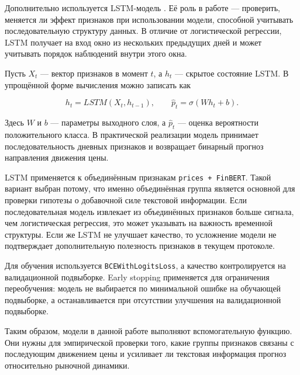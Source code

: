 Дополнительно используется LSTM-модель \cite{hochreiter1997lstm}. Её роль в работе --- проверить, меняется ли эффект признаков при использовании модели, способной учитывать последовательную структуру данных. В отличие от логистической регрессии, LSTM получает на вход окно из нескольких предыдущих дней и может учитывать порядок наблюдений внутри этого окна.

Пусть $X_t$ --- вектор признаков в момент $t$, а $h_t$ --- скрытое состояние LSTM. В упрощённой форме вычисления можно записать как

\[
h_t = LSTM(X_t, h_{t-1}),
\qquad
\widehat{p}_t = \sigma(W h_t + b).
\]

Здесь $W$ и $b$ --- параметры выходного слоя, а $\widehat{p}_t$ --- оценка вероятности положительного класса. В практической реализации модель принимает последовательность дневных признаков и возвращает бинарный прогноз направления движения цены.

LSTM применяется к объединённым признакам \texttt{prices + FinBERT}. Такой вариант выбран потому, что именно объединённая группа является основной для проверки гипотезы о добавочной силе текстовой информации. Если последовательная модель извлекает из объединённых признаков больше сигнала, чем логистическая регрессия, это может указывать на важность временной структуры. Если же LSTM не улучшает качество, то усложнение модели не подтверждает дополнительную полезность признаков в текущем протоколе.

Для обучения используется \texttt{BCEWithLogitsLoss}, а качество контролируется на валидационной подвыборке. Early stopping применяется для ограничения переобучения: модель не выбирается по минимальной ошибке на обучающей подвыборке, а останавливается при отсутствии улучшения на валидационной подвыборке.

Таким образом, модели в данной работе выполняют вспомогательную функцию. Они нужны для эмпирической проверки того, какие группы признаков связаны с последующим движением цены и усиливает ли текстовая информация прогноз относительно рыночной динамики.
